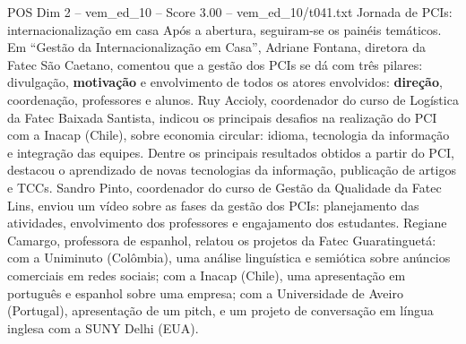 \begin{textsample}{POS Dim 2 – vem\_ed\_10 – Score 3.00 – vem\_ed\_10/t041.txt}  \label{ex:f2_pos_185}
Jornada de PCIs: internacionalização em casa Após a abertura, seguiram-se os painéis temáticos.
Em “Gestão da Internacionalização em Casa”, Adriane Fontana, diretora da Fatec São Caetano, comentou que a gestão dos PCIs se dá com três pilares: divulgação, \textbf{motivação} e envolvimento de todos os atores envolvidos: \textbf{direção}, coordenação, professores e alunos.
Ruy Accioly, coordenador do curso de Logística da Fatec Baixada Santista, indicou os principais desafios na realização do PCI com a Inacap (Chile), sobre economia circular: idioma, tecnologia da informação e integração das equipes.
Dentre os principais resultados obtidos a partir do PCI, destacou o aprendizado de novas tecnologias da informação, publicação de artigos e TCCs.
Sandro Pinto, coordenador do curso de Gestão da Qualidade da Fatec Lins, enviou um vídeo sobre as fases da gestão dos PCIs: planejamento das atividades, envolvimento dos professores e engajamento dos estudantes.
Regiane Camargo, professora de espanhol, relatou os projetos da Fatec Guaratinguetá: com a Uniminuto (Colômbia), uma análise linguística e semiótica sobre anúncios comerciais em redes sociais; com a Inacap (Chile), uma apresentação em português e espanhol sobre uma empresa; com a Universidade de Aveiro (Portugal), apresentação de um pitch, e um projeto de conversação em língua inglesa com a SUNY Delhi (EUA).

\end{textsample}
